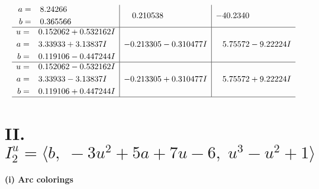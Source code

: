 \documentclass[1p]{elsarticle_modified}
\theoremstyle{definition}
\begin{document}
$$\begin{array}{c|c|c}
\begin{aligned}
a &= \phantom{-}8.24266\phantom{ +0.000000I} \\
b &= \phantom{-}0.365566\phantom{ +0.000000I}\end{aligned}
 & \phantom{-}0.210538\phantom{ +0.000000I} & -40.2340\phantom{ +0.000000I} \\ \hline\begin{aligned}
u &= \phantom{-}0.152062 + 0.532162 I \\
a &= \phantom{-}3.33933 + 3.13837 I \\
b &= \phantom{-}0.119106 - 0.447244 I\end{aligned}
 & -0.213305 - 0.310477 I & \phantom{-}5.75572 - 9.22224 I \\ \hline\begin{aligned}
u &= \phantom{-}0.152062 - 0.532162 I \\
a &= \phantom{-}3.33933 - 3.13837 I \\
b &= \phantom{-}0.119106 + 0.447244 I\end{aligned}
 & -0.213305 + 0.310477 I & \phantom{-}5.75572 + 9.22224 I\\
 \hline 
 \end{array}$$\newpage\newpage\renewcommand{\arraystretch}{1}
\centering \section*{II. $I^u_{2}= \langle b,\;-3 u^2+5 a+7 u-6,\;u^3- u^2+1 \rangle$}
\flushleft \textbf{(i) Arc colorings}\\
\end{document}
